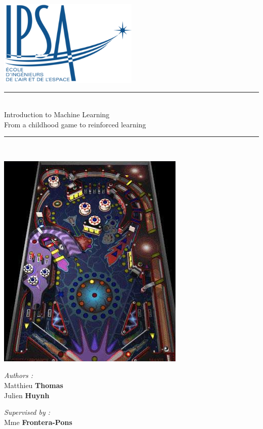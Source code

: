 \documentclass[a4paper,12pt,calibri,oneside,openany]{book}
\theoremstyle{break}
\begin{document}
\renewcommand{\bibname}{Bibliographie et Webographie}

\begin{titlepage}
\begin{center}

\includegraphics[width=0.5\textwidth]{ipsa}\\[1cm]



\rule{\linewidth}{0.5mm} \\[0.4cm]
{ \huge  Introduction to Machine Learning }\\
From a childhood game to reinforced learning
\rule{\linewidth}{0.5mm} \\[1.5cm]
\begin{center}
	\includegraphics[width=0.3\linewidth]{coverimage}
\end{center}
\vspace{0.8cm}
\noindent
\begin{minipage}{0.4\textwidth}
  \begin{flushleft} \large
    \emph{Authors :}\\
    Matthieu \textbf{{Thomas}}\\
    Julien \textbf{{Huynh}}\\
  \end{flushleft}
\end{minipage}%
\begin{minipage}{0.4\textwidth}
  \begin{flushright} \large
    \emph{Supervised by :} \\
    Mme \textbf{Frontera-Pons}\\
  \end{flushright}
\end{minipage}


\end{center}
\end{titlepage}
\end{document}
